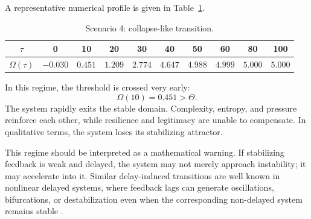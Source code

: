 \documentclass[11pt]{article}
\begin{document}
A representative numerical profile is given in Table~\ref{tab:omega_collapse}.

\begin{table}[h!]
	\centering
	\caption{Scenario 4: collapse-like transition.}
	\label{tab:omega_collapse}
	\begin{tabular}{cccccccccc}
		\toprule
		\(\tau\) & 0 & 10 & 20 & 30 & 40 & 50 & 60 & 80 & 100 \\
		\midrule
		\(\Omega(\tau)\) 
		& \(-0.030\) & \(0.451\) & \(1.209\) & \(2.774\) & \(4.647\) & \(4.988\) & \(4.999\) & \(5.000\) & \(5.000\) \\
		\bottomrule
	\end{tabular}
\end{table}

In this regime, the threshold is crossed very early:
\[
\Omega(10)=0.451>\Theta.
\]
The system rapidly exits the stable domain. Complexity, entropy, and pressure reinforce each other, while resilience and legitimacy are unable to compensate. In qualitative terms, the system loses its stabilizing attractor.

This regime should be interpreted as a mathematical warning. If stabilizing feedback is weak and delayed, the system may not merely approach instability; it may accelerate into it. Similar delay-induced transitions are well known in nonlinear delayed systems, where feedback lags can generate oscillations, bifurcations, or destabilization even when the corresponding non-delayed system remains stable \cite{rihan2021dde,saeedian2022delay,li2024fsdde}.
\end{document}

